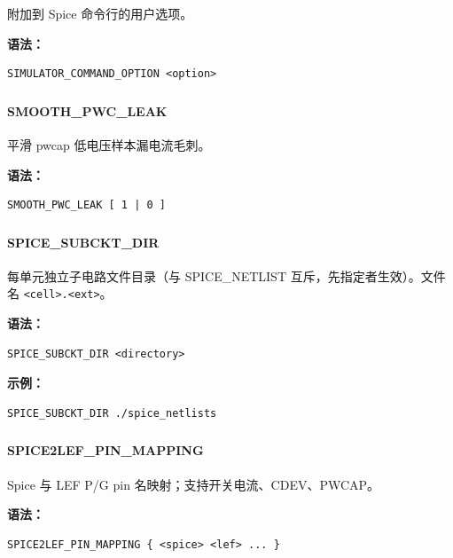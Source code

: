 附加到 Spice 命令行的用户选项。

\textbf{语法：}
\begin{lstlisting}
SIMULATOR_COMMAND_OPTION <option>
\end{lstlisting}

\subsubsection{}
\paragraph*{SMOOTH_PWC_LEAK}

平滑 pwcap 低电压样本漏电流毛刺。

\textbf{语法：}
\begin{lstlisting}
SMOOTH_PWC_LEAK [ 1 | 0 ]
\end{lstlisting}

\subsubsection{}
\paragraph*{SPICE_SUBCKT_DIR}

每单元独立子电路文件目录（与 SPICE\_NETLIST 互斥，先指定者生效）。文件名 \texttt{<cell>.<ext>}。

\textbf{语法：}
\begin{lstlisting}
SPICE_SUBCKT_DIR <directory>
\end{lstlisting}

\textbf{示例：}
\begin{lstlisting}
SPICE_SUBCKT_DIR ./spice_netlists
\end{lstlisting}

\subsubsection{}
\paragraph*{SPICE2LEF_PIN_MAPPING}

Spice 与 LEF P/G pin 名映射；支持开关电流、CDEV、PWCAP。

\textbf{语法：}
\begin{lstlisting}
SPICE2LEF_PIN_MAPPING { <spice> <lef> ... }
\end{lstlisting}

